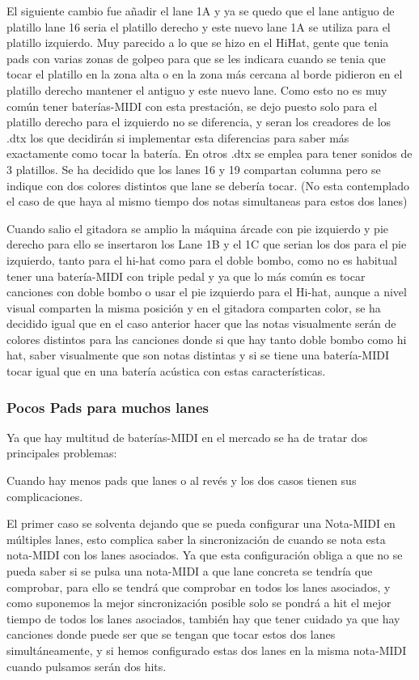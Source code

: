 \documentclass[a4paper,11pt,oneside]{book}
\begin{document}
El siguiente cambio fue añadir el lane 1A y ya se quedo que el lane antiguo de platillo lane 16 seria el platillo derecho y este nuevo lane 1A se utiliza para el platillo izquierdo. Muy parecido a lo que se hizo en el HiHat, gente que tenia pads con varias zonas de golpeo para que se les indicara cuando se tenia que tocar el platillo en la zona alta o en la zona más cercana al borde pidieron en el platillo derecho mantener el antiguo y este nuevo lane. Como esto no es muy común tener baterías-MIDI con esta prestación, se dejo puesto solo para el platillo derecho para el izquierdo no se diferencia, y seran los creadores de los .dtx los que decidirán si implementar esta diferencias para saber más exactamente como tocar la batería.
 En otros .dtx se emplea para tener sonidos de 3 platillos. Se ha decidido que los lanes 16 y 19 compartan columna pero se indique con dos colores distintos que lane se debería tocar. (No esta contemplado el caso de que haya al mismo tiempo dos notas simultaneas para estos dos lanes)

 
Cuando salio el gitadora se amplio la máquina árcade con pie izquierdo y pie derecho para ello se insertaron los Lane 1B y el 1C que serian los dos para el pie izquierdo, tanto para el hi-hat como para el doble bombo, como no es habitual tener una batería-MIDI con triple pedal y ya que lo más común es tocar canciones con doble bombo o usar el pie izquierdo para el Hi-hat, aunque a nivel visual comparten la misma posición y en el gitadora comparten color, se ha decidido igual que en el caso anterior hacer que las notas visualmente serán de colores distintos para las canciones donde si que hay tanto doble bombo como hi hat, saber visualmente que son notas distintas y si se tiene una batería-MIDI tocar igual que en una batería acústica con estas características.
 
\subsubsection{Pocos Pads para muchos lanes} 

Ya que hay multitud de baterías-MIDI en el mercado se ha de tratar dos principales problemas:

Cuando hay menos pads que lanes o al revés y los dos casos tienen sus complicaciones.

El primer caso se solventa dejando que se pueda configurar una Nota-MIDI en múltiples lanes, esto complica saber la sincronización de cuando se nota esta nota-MIDI con los lanes asociados. Ya que esta configuración obliga a que no se pueda saber si se pulsa una nota-MIDI a que lane concreta se tendría que comprobar, para ello se tendrá que comprobar en todos los lanes asociados, y como suponemos la mejor sincronización posible solo se pondrá a hit el mejor tiempo de todos los lanes asociados, también hay que tener cuidado ya que hay canciones donde puede ser que se tengan que tocar estos dos lanes simultáneamente, y si hemos configurado estas dos lanes en la misma nota-MIDI cuando pulsamos serán dos hits.
\end{document}
